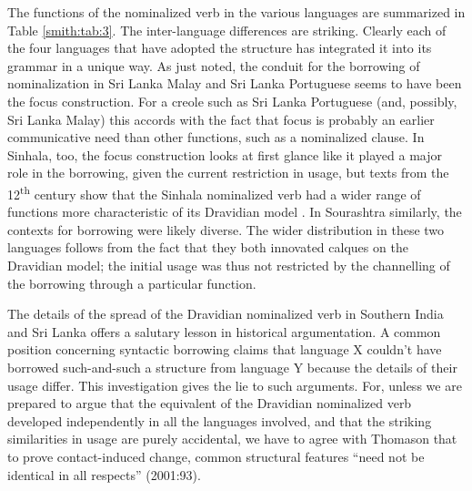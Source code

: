 The functions of the nominalized verb in the various languages are summarized in Table \ref{smith:tab:3}. The inter-language differences are striking. Clearly each of the four languages that have adopted the structure has integrated it into its grammar in a unique way. As just noted, the conduit for the borrowing of nominalization in Sri Lanka Malay and Sri Lanka Portuguese seems to have been the focus construction. For a creole such as Sri Lanka Portuguese (and, possibly, Sri Lanka Malay) this accords with the fact that focus is probably an earlier communicative need than other functions, such as a nominalized clause. In Sinhala, too, the focus construction looks at first glance like it played a major role in the borrowing, given the current restriction in usage, but texts from the 12\textsuperscript{th} century show that the Sinhala nominalized verb had a wider range of functions more characteristic of its Dravidian model \citep[166-9]{Gair1986}. In Sourashtra similarly, the contexts for borrowing were likely diverse. The wider distribution in these two languages follows from the fact that they both innovated calques on the Dravidian model; the initial usage was thus not restricted by the channelling of the borrowing through a particular function. 

The details of the spread of the Dravidian nominalized verb in Southern India and Sri Lanka offers a salutary lesson in historical argumentation. A common position concerning syntactic borrowing claims that language X couldn't have borrowed such-and-such a structure from language Y because the details of their usage differ. This investigation gives the lie to such arguments. For, unless we are prepared to argue that the equivalent of the Dravidian nominalized verb developed independently in all the languages involved, and that the striking similarities in usage are purely accidental, we have to agree with Thomason that to prove contact-induced change, common structural features ``need not be identical in all respects'' (2001:93). \nocite{Thomason2001}

